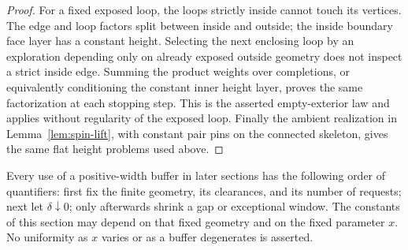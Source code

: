 \begin{proof}
For a fixed exposed loop, the loops strictly inside cannot touch its
vertices. The edge and loop factors split between inside and outside;
the inside boundary face layer has a constant height. Selecting the next
enclosing loop by an exploration depending only on already exposed
outside geometry does not inspect a strict inside edge. Summing the
product weights over completions, or equivalently conditioning the
constant inner height layer, proves the same factorization at each
stopping step. This is the asserted empty-exterior law and applies
without regularity of the exposed loop. Finally the ambient realization
in Lemma~\ref{lem:spin-lift}, with constant pair pins on the connected
skeleton, gives the same flat height problems used above.
\end{proof}

Every use of a positive-width buffer in later sections has the following
order of quantifiers: first fix the finite geometry, its clearances, and
its number of requests; next let $\delta\downarrow0$; only afterwards
shrink a gap or exceptional window. The constants of this section may
depend on that fixed geometry and on the fixed parameter $x$. No
uniformity as $x$ varies or as a buffer degenerates is asserted.
